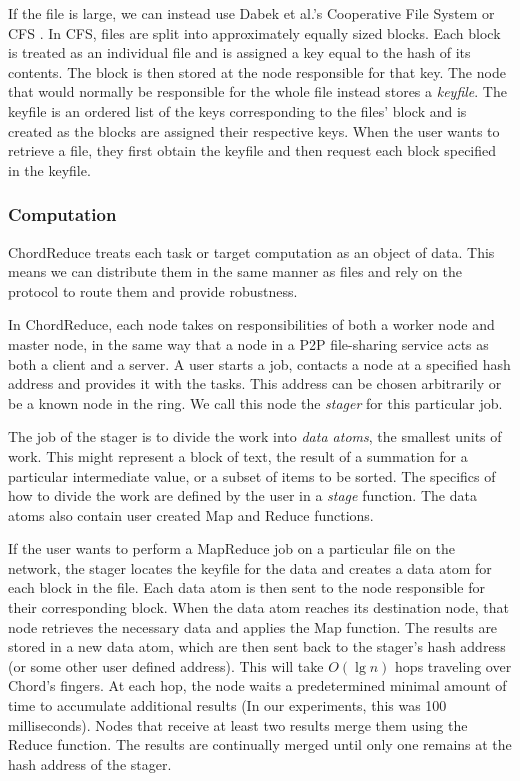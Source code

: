 If the file is large, we can instead use Dabek et al.'s Cooperative File System or CFS \cite{CFS}.
In CFS, files are split into approximately equally sized blocks.
Each block is treated as an individual file and is assigned a key equal to the hash of its contents.
The block is then stored at the node responsible for that key.
The node that would normally be responsible for the whole file instead stores a \textit{keyfile}.
The keyfile is an ordered list of the keys corresponding to the files' block and is created as the blocks are assigned their respective keys.
When the user wants to retrieve a file, they first obtain the keyfile and then request each block specified in the keyfile.


\subsubsection{Computation}
ChordReduce treats each task or target computation as an object of data.
This means we can distribute them in the same manner as files and rely on the protocol to route them and provide robustness.


In ChordReduce, each node takes on responsibilities of both a worker node and master node, in the same way that a node in a P2P file-sharing service acts as both a client and a server.
A user starts a job, contacts a node at a specified hash address and provides it with the tasks.
This address can be chosen arbitrarily or be a known node in the ring.
We call this node the \textit{stager} for this particular job.

The job of the stager is to divide the work into \emph{data atoms}, the smallest units of work.
This might represent a block of text, the result of a summation for a particular intermediate value, or a subset of items to be sorted.
The specifics of how to divide the work are defined by the user in a \emph{stage} function.
The data atoms also contain user created Map and Reduce functions.

If the user wants to perform a MapReduce job on a particular file on the network, the stager locates the keyfile for the data and creates a data atom for each block in the file.
Each data atom is then sent to the node responsible for their corresponding block.
When the data atom reaches its destination node, that node retrieves the necessary data and applies the Map function.
The results are stored in a new data atom,  which are then sent back to the stager's hash address (or some other user defined address).
This will take $O(\lg n)$ hops traveling over Chord's fingers.
At each hop, the node waits a predetermined minimal amount of time to accumulate additional results (In our experiments, this was 100 milliseconds).
Nodes that receive at least two results merge them using the Reduce function.
The results are continually merged until only one remains at the hash address of the stager.


